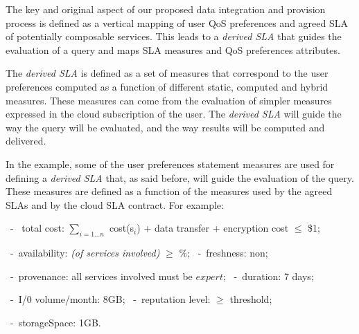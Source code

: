 
The key and original aspect of  our proposed data integration and provision process is  defined as a vertical mapping of user QoS preferences and agreed SLA of potentially composable services. 
This  leads to a {\em derived SLA} that guides the evaluation of a query and maps SLA measures and QoS preferences attributes.  




The {\em derived SLA} is defined as a set of measures that correspond to the user preferences computed as a function of different static, computed and hybrid measures. These measures can come from the evaluation of simpler measures expressed in the cloud subscription of the user. 
The {\em derived SLA}  will guide the way the query will be evaluated, and the way results will be computed and delivered.

In the example, some of the user preferences statement measures are used for defining a {\em derived SLA} that, as said before, will guide the evaluation of the query. 
These measures are defined as a function of the measures used by the agreed SLAs and by the cloud SLA contract. For example: 
\begin{trivlist}\sf\footnotesize
 \item[~-~ total cost:] $\sum_{i = 1\dots n}$ cost(s$_i$) + data transfer + encryption cost $\leq$ \$1;
 \item[~-~availability:] {\em (of services involved)} $\geq$ {$\%$};
 ~-~freshness: non;
 \item[~-~provenance:] all services involved must be $expert$;
  ~-~duration: 7 days;
 \item[~-~I/0 volume/month:] 8GB;
  ~-~reputation level: $\geq$ threshold;
 \item[~-~storageSpace:] 1GB.
 \end{trivlist} 
 
